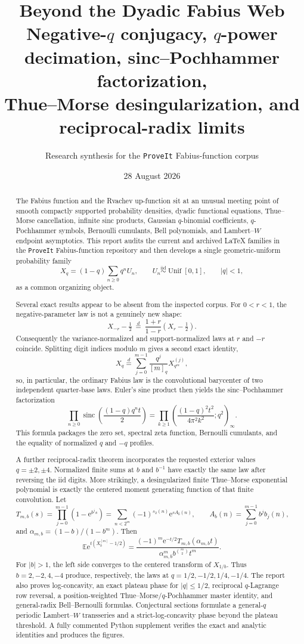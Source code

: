 \documentclass[11pt,oneside]{article}
\title{\bfseries Beyond the Dyadic Fabius Web\\[0.35em]
\large Negative-\(q\) conjugacy, \(q\)-power decimation, sinc--Pochhammer factorization,\\
Thue--Morse desingularization, and reciprocal-radix limits}
\author{Research synthesis for the \texttt{ProveIt} Fabius-function corpus}
\date{28 August 2026}
\theoremstyle{definition}
\theoremstyle{remark}
\newcommand{\E}{\mathbb E}
\newcommand{\Unif}{\operatorname{Unif}}
\newcommand{\sinc}{\operatorname{sinc}}
\newcommand{\e}{\mathrm e}
\newcommand{\repo}{\texttt{ProveIt}}
\begin{document}
\maketitle

\begin{abstract}
The Fabius function and the Rvachev up-function sit at an unusual meeting point of
smooth compactly supported probability densities, dyadic functional equations,
Thue--Morse cancellation, infinite sinc products, Gaussian \(q\)-binomial
coefficients, \(q\)-Pochhammer symbols, Bernoulli cumulants, Bell polynomials, and
Lambert--\(W\) endpoint asymptotics.  This report audits the current and archived
LaTeX families in the \repo{} Fabius-function repository and then develops a
single geometric-uniform probability family
\[
 X_q=(1-q)\sum_{n\geq0}q^nU_n,\qquad U_n\stackrel{\mathrm{iid}}{\sim}\Unif[0,1],
 \qquad |q|<1,
\]
as a common organizing object.

Several exact results appear to be absent from the inspected corpus.  For
\(0<r<1\), the negative-parameter law is not a genuinely new shape:
\[
 X_{-r}-\tfrac12\ \stackrel d=\ \frac{1+r}{1-r}
 \left(X_r-\tfrac12\right).
\]
Consequently the variance-normalized and support-normalized laws at \(r\) and
\(-r\) coincide.  Splitting digit indices modulo \(m\) gives a second exact
identity,
\[
 X_q\stackrel d=\sum_{j=0}^{m-1}\frac{q^j}{[m]_q}X_{q^m}^{(j)},
\]
so, in particular, the ordinary Fabius law is the convolutional barycenter of
two independent quarter-base laws.  Euler's sine product then yields the
sinc--Pochhammer factorization
\[
 \prod_{n\ge0}\sinc\!\left(\frac{(1-q)q^nt}{2}\right)
 =\prod_{k\ge1}\left(\frac{(1-q)^2t^2}{4\pi^2k^2};q^2\right)_\infty.
\]
This formula packages the zero set, spectral zeta function, Bernoulli
cumulants, and the equality of normalized \(q\) and \(-q\) profiles.

A further reciprocal-radix theorem incorporates the requested exterior values
\(q=\pm2,\pm4\).  Normalized finite sums at \(b\) and \(b^{-1}\) have exactly the
same law after reversing the iid digits.  More strikingly, a desingularized
finite Thue--Morse exponential polynomial is exactly the centered moment
generating function of that finite convolution.  Let
\[
 T_{m,b}(s)=\prod_{j=0}^{m-1}(1-\e^{b^js})
 =\sum_{n<2^m}(-1)^{s_2(n)}\e^{sA_b(n)},
 \qquad A_b(n)=\sum_{j=0}^{m-1}b^jb_j(n),
\]
and \(\alpha_{m,b}=(1-b)/(1-b^m)\).  Then
\[
 \E\e^{t(X_b^{[m]}-1/2)}
 =\frac{(-1)^m\e^{-t/2}T_{m,b}(\alpha_{m,b}t)}
 {\alpha_{m,b}^m b^{\binom m2}t^m}.
\]
For \(|b|>1\), the left side converges to the centered transform of
\(X_{1/b}\).  Thus \(b=2,-2,4,-4\) produce, respectively, the laws at
\(q=1/2,-1/2,1/4,-1/4\).  The report also proves log-concavity, an exact plateau
phase for \(|q|\leq1/2\), reciprocal \(q\)-Lagrange row reversal, a
position-weighted Thue--Morse/\(q\)-Pochhammer master identity, and general-radix
Bell--Bernoulli formulas.  Conjectural sections formulate a general-\(q\)
periodic Lambert--\(W\) transseries and a strict-log-concavity phase beyond the
plateau threshold.  A fully commented Python supplement verifies the exact and
analytic identities and produces the figures.
\end{abstract}
\end{document}
